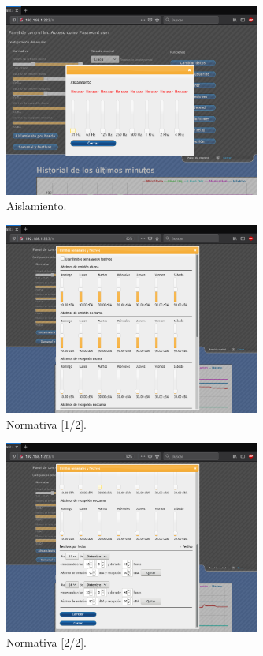 \begin{figure}[ht]
    \centering
    \includegraphics[width=0.75\textwidth]{imagenes/interfaz/Interfaz_3_aislamiento.png}
    \caption{Aislamiento.}
\end{figure}

\begin{figure}[ht]
    \centering
    \includegraphics[width=0.75\textwidth]{imagenes/interfaz/Interfaz_4_festivos_0.png}
    \caption{Normativa [1/2].}
\end{figure}

\begin{figure}[ht]
    \centering
    \includegraphics[width=0.75\textwidth]{imagenes/interfaz/Interfaz_4_festivos_1.png}
    \caption{Normativa [2/2].}
\end{figure}

